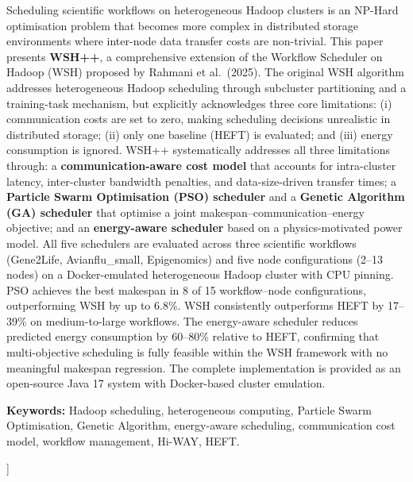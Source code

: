 \documentclass[10pt,twocolumn]{article}
\begin{document}
{%
\begin{onecolabstract}
\noindent
Scheduling scientific workflows on heterogeneous Hadoop clusters is an NP-Hard
optimisation problem that becomes more complex in distributed storage environments
where inter-node data transfer costs are non-trivial. This paper presents
\textbf{WSH++}, a comprehensive extension of the Workflow Scheduler on Hadoop (WSH)
proposed by Rahmani et al.\ (2025). The original WSH algorithm addresses
heterogeneous Hadoop scheduling through subcluster partitioning and a training-task
mechanism, but explicitly acknowledges three core limitations: (i) communication
costs are set to zero, making scheduling decisions unrealistic in distributed storage;
(ii) only one baseline (HEFT) is evaluated; and (iii) energy consumption is ignored.
WSH++ systematically addresses all three limitations through: a
\textbf{communication-aware cost model} that accounts for intra-cluster latency,
inter-cluster bandwidth penalties, and data-size-driven transfer times; a
\textbf{Particle Swarm Optimisation (PSO) scheduler} and a \textbf{Genetic
Algorithm (GA) scheduler} that optimise a joint makespan--communication--energy
objective; and an \textbf{energy-aware scheduler} based on a physics-motivated power
model. All five schedulers are evaluated across three scientific workflows
(Gene2Life, Avianflu\_small, Epigenomics) and five node configurations (2--13 nodes)
on a Docker-emulated heterogeneous Hadoop cluster with CPU pinning. PSO achieves the
best makespan in 8 of 15 workflow--node configurations, outperforming WSH by up to
6.8\%. WSH consistently outperforms HEFT by 17--39\% on medium-to-large workflows.
The energy-aware scheduler reduces predicted energy consumption by 60--80\% relative
to HEFT, confirming that multi-objective scheduling is fully feasible within the WSH
framework with no meaningful makespan regression. The complete implementation is
provided as an open-source Java 17 system with Docker-based cluster emulation.

\smallskip
\noindent\textbf{Keywords:} Hadoop scheduling, heterogeneous computing, Particle
Swarm Optimisation, Genetic Algorithm, energy-aware scheduling, communication cost
model, workflow management, Hi-WAY, HEFT.
\end{onecolabstract}
\vspace{0.8cm}
}]

\end{document}
